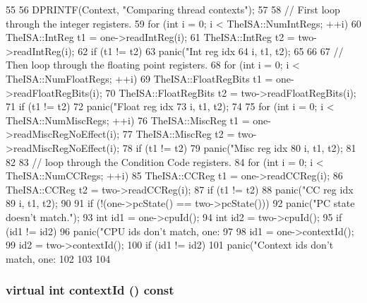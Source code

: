 \begin{DoxyCode}
55 {
56     DPRINTF(Context, "Comparing thread contexts\n");
57 
58     // First loop through the integer registers.
59     for (int i = 0; i < TheISA::NumIntRegs; ++i) {
60         TheISA::IntReg t1 = one->readIntReg(i);
61         TheISA::IntReg t2 = two->readIntReg(i);
62         if (t1 != t2)
63             panic("Int reg idx %
64                   i, t1, t2);
65     }
66 
67     // Then loop through the floating point registers.
68     for (int i = 0; i < TheISA::NumFloatRegs; ++i) {
69         TheISA::FloatRegBits t1 = one->readFloatRegBits(i);
70         TheISA::FloatRegBits t2 = two->readFloatRegBits(i);
71         if (t1 != t2)
72             panic("Float reg idx %
73                   i, t1, t2);
74     }
75     for (int i = 0; i < TheISA::NumMiscRegs; ++i) {
76         TheISA::MiscReg t1 = one->readMiscRegNoEffect(i);
77         TheISA::MiscReg t2 = two->readMiscRegNoEffect(i);
78         if (t1 != t2)
79             panic("Misc reg idx %
80                   i, t1, t2);
81     }
82 
83     // loop through the Condition Code registers.
84     for (int i = 0; i < TheISA::NumCCRegs; ++i) {
85         TheISA::CCReg t1 = one->readCCReg(i);
86         TheISA::CCReg t2 = two->readCCReg(i);
87         if (t1 != t2)
88             panic("CC reg idx %
89                   i, t1, t2);
90     }
91     if (!(one->pcState() == two->pcState()))
92         panic("PC state doesn't match.");
93     int id1 = one->cpuId();
94     int id2 = two->cpuId();
95     if (id1 != id2)
96         panic("CPU ids don't match, one: %
97 
98     id1 = one->contextId();
99     id2 = two->contextId();
100     if (id1 != id2)
101         panic("Context ids don't match, one: %
102 
103 
104 }
\end{DoxyCode}
\hypertarget{classThreadContext_a5a3ce3f955d2ec16ac6f2aa21e42f3a0}{
\subsubsection[{contextId}]{\setlength{\rightskip}{0pt plus 5cm}virtual int contextId () const}}
\label{classThreadContext_a5a3ce3f955d2ec16ac6f2aa21e42f3a0}


